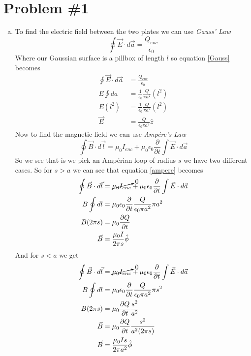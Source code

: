 \documentclass[11pt]{article}
\numberwithin{equation}{section}
\newcommand{\dl}{d\vec{l}}
\newcommand{\da}{d\vec{a}}
\begin{document}


\section{Problem \#1}
\begin{enumerate}[(a)]
\item
To find the electric field between the two plates we can use \emph{Gauss' Law}
\begin{equation}
\oint\vec{E}\cdot\da = \frac{Q_{enc}}{\epsilon_0}
\label{Gauss}
\end{equation}
Where our Gaussian surface is a pillbox of length $l$ so equation \ref{Gauss} becomes
\begin{align*} 
\oint\vec{E}\cdot\da &= \frac{Q_{enc}}{\epsilon_0}\\
E\oint da &= \frac{1}{\epsilon_0}\frac{Q}{\pi a^2}(l^2)\\
E(l^2) &= \frac{1}{\epsilon_0}\frac{Q}{\pi a^2}(l^2)\\
\vec{E} &= \frac{Q}{\epsilon_0\pi a^2}\hat{z}
\end{align*} 
Now to find the magnetic field we can use \emph{Amp\'{e}re's Law}
\begin{equation}
\oint\vec{B}\cdot\dl = \mu_0I_{enc}+\mu_0\epsilon_0\frac{\partial}{\partial t}\int\vec{E}\cdot\da
\label{ampere}
\end{equation}
So we see that is we pick an Amp\'{e}rian loop of radius $s$ we have two different cases. So for $s>a$ we can see that equation \ref{ampere} becomes 
\begin{align*}
\oint\vec{B}\cdot\dl &= \cancelto{0}{\mu_0I_{enc}}+\mu_0\epsilon_0\frac{\partial}{\partial t}\int\vec{E}\cdot\da\\
B\oint dl &= \mu_0\epsilon_0\frac{\partial}{\partial t}\frac{Q}{\epsilon_0\pi a^2}\pi a^2\\
B(2\pi s) &= \mu_0\frac{\partial Q}{\partial t}\\
\vec{B} &= \frac{\mu_0 I}{2\pi s}\hat{\phi}
\end{align*}
And for $s<a$ we get
\begin{align*}
\oint\vec{B}\cdot\dl &= \cancelto{0}{\mu_0I_{enc}}+\mu_0\epsilon_0\frac{\partial}{\partial t}\int\vec{E}\cdot\da\\
B\oint dl &= \mu_0\epsilon_0\frac{\partial}{\partial t}\frac{Q}{\epsilon_0\pi a^2}\pi s^2\\
B(2\pi s) &= \mu_0\frac{\partial Q}{\partial t}\frac{s^2}{a^2}\\
\vec{B} &= \mu_0\frac{\partial Q}{\partial t}\frac{s^2}{a^2(2\pi s)}\\
\vec{B} &= \frac{\mu_0Is}{2\pi a^2}\hat{\phi}
\end{align*}


\end{enumerate}
\end{document}
